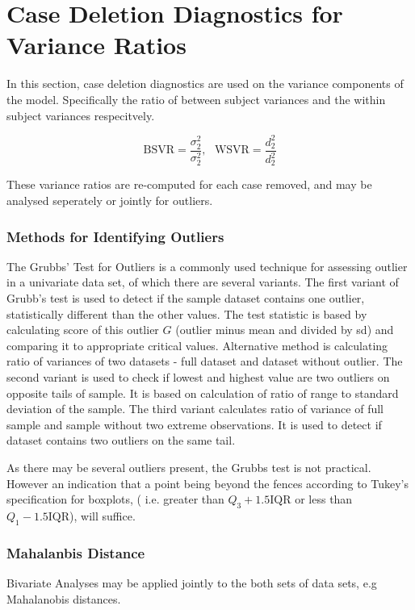 \documentclass[Main.tex]{subfiles}
\begin{document}
\section{Case Deletion Diagnostics for Variance Ratios}
In this section, case deletion diagnostics are used on the variance components of the model. Specifically the ratio of between subject variances and the within subject variances respecitvely.


\[ \mbox{BSVR} = \frac{\sigma^2_2}{\sigma^2_2} , \mbox{   } \mbox{WSVR} = \frac{d^2_2}{d^2_2} \]

These variance ratios are re-computed for each case removed, and may be analysed seperately or jointly for outliers.

\subsubsection{Methods for Identifying Outliers}
The Grubbs' Test for Outliers is a commonly used technique for assessing outlier in a univariate data set, of which there are several variants. The first variant of Grubb's test is used to detect if the sample dataset contains one outlier, statistically different than
the other values. The test statistic is based by calculating score of this outlier $G$ (outlier minus mean and divided
by sd) and comparing it to appropriate critical values. Alternative method is calculating ratio of
variances of two datasets - full dataset and dataset without outlier. 
The second variant is used to check if lowest and highest value are two outliers on opposite tails of
sample. It is based on calculation of ratio of range to standard deviation of the sample.
The third variant calculates ratio of variance of full sample and sample without two extreme observations.
It is used to detect if dataset contains two outliers on the same tail.

As there may be several outliers present, the Grubbs test is not practical. However an indication that a point being beyond the fences according to Tukey's 
specification for boxplots, ( i.e. greater than $Q_3 +1.5 \mbox{IQR}$ or less than $Q_1 - 1.5 \mbox{IQR}$), will suffice.

\subsubsection{Mahalanbis Distance}
Bivariate Analyses may be applied jointly to the both sets of data sets, e.g Mahalanobis distances.
\end{document}
